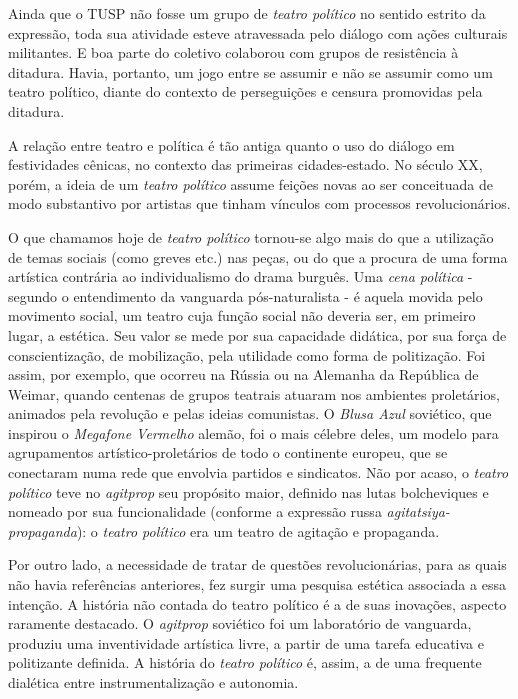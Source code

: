 Ainda que o TUSP não fosse um grupo de \textit{teatro político} no sentido
estrito da expressão, toda sua atividade esteve atravessada pelo diálogo
com ações culturais militantes. E boa parte do coletivo colaborou com
grupos de resistência à ditadura. Havia, portanto, um jogo entre se
assumir e não se assumir como um teatro político, diante do contexto de
perseguições e censura promovidas pela ditadura.

A relação entre teatro e política é tão antiga quanto o uso do diálogo
em festividades cênicas, no contexto das primeiras cidades-estado. No
século XX, porém, a ideia de um \textit{teatro político} assume feições
novas ao ser conceituada de modo substantivo por artistas que tinham
vínculos com processos revolucionários.

O que chamamos hoje de \textit{teatro político} tornou-se algo mais do que
a utilização de temas sociais (como greves etc.) nas peças, ou do que a
procura de uma forma artística contrária ao individualismo do drama
burguês. Uma \textit{cena política} - segundo o entendimento da vanguarda
pós-naturalista - é aquela movida pelo movimento social, um teatro cuja
função social não deveria ser, em primeiro lugar, a estética. Seu valor
se mede por sua capacidade didática, por sua força de conscientização,
de mobilização, pela utilidade como forma de politização. Foi assim, por
exemplo, que ocorreu na Rússia ou na Alemanha da República de Weimar,
quando centenas de grupos teatrais atuaram nos ambientes proletários,
animados pela revolução e pelas ideias comunistas. O \textit{Blusa Azul}
soviético, que inspirou o \textit{Megafone Vermelho} alemão, foi o mais
célebre deles, um modelo para agrupamentos artístico-proletários de todo
o continente europeu, que se conectaram numa rede que envolvia partidos
e sindicatos. Não por acaso, o \textit{teatro político} teve no
\textit{agitprop} seu propósito maior, definido nas lutas bolcheviques e
nomeado por sua funcionalidade (conforme a expressão russa
\textit{agitatsiya-propaganda}): o \textit{teatro político} era um teatro de
agitação e propaganda.

Por outro lado, a necessidade de tratar de questões revolucionárias,
para as quais não havia referências anteriores, fez surgir uma pesquisa
estética associada a essa intenção. A história não contada do teatro
político é a de suas inovações, aspecto raramente destacado. O
\textit{agitprop} soviético foi um laboratório de vanguarda, produziu uma
inventividade artística livre, a partir de uma tarefa educativa e
politizante definida. A história do \textit{teatro político} é, assim, a de
uma frequente dialética entre instrumentalização e autonomia.

